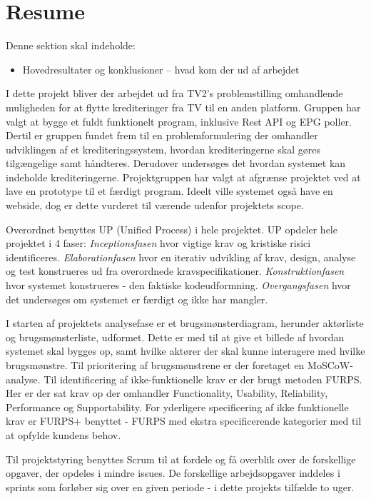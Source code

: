 \section{Resume}
Denne sektion skal indeholde:

\begin{itemize}
    \item Hovedresultater og konklusioner  – hvad kom der ud af arbejdet
\end{itemize}{}

I dette projekt bliver der arbejdet ud fra TV2's problemstilling omhandlende muligheden for at flytte krediteringer fra TV til en anden platform.  Gruppen har valgt at bygge et fuldt funktionelt program, inklusive Rest API og EPG poller. Dertil er gruppen fundet frem til en problemformulering der omhandler udviklingen af et krediteringssystem, hvordan krediteringerne skal gøres tilgængelige samt håndteres. Derudover undersøges det hvordan systemet kan indeholde krediteringerne.
Projektgruppen har valgt at afgrænse projektet ved at lave en prototype til et færdigt program. Ideelt ville systemet også have en webside, dog er dette vurderet til værende udenfor projektets scope.

Overordnet benyttes UP (Unified Process) i hele projektet. UP opdeler hele projektet i 4 faser: \textit{Inceptionsfasen} hvor vigtige krav og kristiske risici identificeres. \textit{Elaborationfasen} hvor en iterativ udvikling af krav, design, analyse og test konstrueres ud fra overordnede kravspecifikationer. \textit{Konstruktionfasen} hvor systemet konstrueres - den faktiske kodeudformning. \textit{Overgangsfasen} hvor det undersøges om systemet er færdigt og ikke har mangler.

I starten af projektets analysefase er et brugsmønsterdiagram, herunder aktørliste og brugs\-møn\-ster\-li\-ste, udformet. Dette er med til at give et billede af hvordan systemet skal bygges op, samt hvilke aktører der skal kunne interagere med hvilke brugsmønstre. Til prioritering af brugsmønstrene er der foretaget en MoSCoW-analyse.
Til identificering af ikke-funktionelle krav er der brugt metoden FURPS. Her er der sat krav op der omhandler Functionality, Usability, Reliability, Performance og Supportability. For yderligere specificering af ikke funktionelle krav er FURPS+ benyttet - FURPS med ekstra specificerende kategorier med til at opfylde kundens behov.

Til projektstyring benyttes Scrum til at fordele og få overblik over de forskellige opgaver, der opdeles i mindre issues. De forskellige arbejdsopgaver inddeles i sprints som forløber sig over en given periode - i dette projekts tilfælde to uger.



